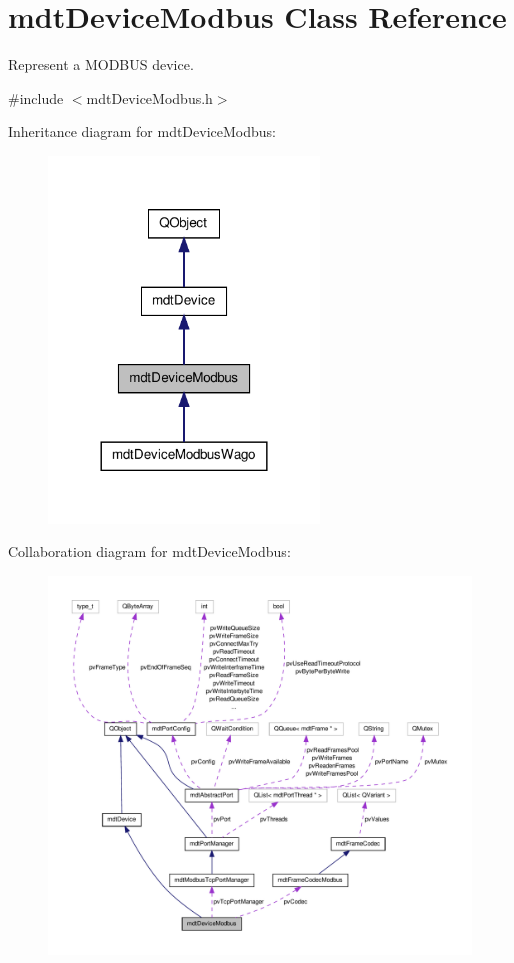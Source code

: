 \hypertarget{classmdt_device_modbus}{\section{mdt\-Device\-Modbus Class Reference}
\label{classmdt_device_modbus}
}


Represent a M\-O\-D\-B\-U\-S device.  




{\ttfamily \#include $<$mdt\-Device\-Modbus.\-h$>$}



Inheritance diagram for mdt\-Device\-Modbus\-:\nopagebreak
\begin{figure}[H]
\begin{center}
\leavevmode
\includegraphics[width=204pt]{classmdt_device_modbus__inherit__graph}
\end{center}
\end{figure}


Collaboration diagram for mdt\-Device\-Modbus\-:\nopagebreak
\begin{figure}[H]
\begin{center}
\leavevmode
\includegraphics[width=350pt]{classmdt_device_modbus__coll__graph}
\end{center}
\end{figure}
